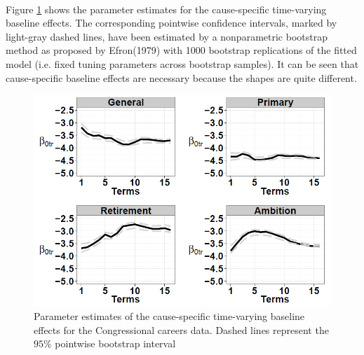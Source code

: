\documentclass[]{article}
\begin{document}
        \paragraph{}Figure \ref{Figure2} shows the parameter estimates for the cause-specific time-varying baseline effects. The corresponding pointwise confidence intervals, marked by light-gray dashed lines, have been estimated by a nonparametric bootstrap method as proposed by Efron(1979) with 1000 bootstrap replications of the fitted model (i.e. fixed tuning parameters
        across bootstrap samples). It can be seen that cause-specific baseline effects are necessary because the shapes are quite different. 
        \begin{figure}[]
            \centering
            \includegraphics[scale=0.7]{./Figure2.png}
            \caption{Parameter estimates of the cause-specific time-varying baseline effects for the
                Congressional careers data. Dashed lines represent the $95\%$ pointwise bootstrap interval}
            \label{Figure2}
       \end{figure} 
\end{document}
